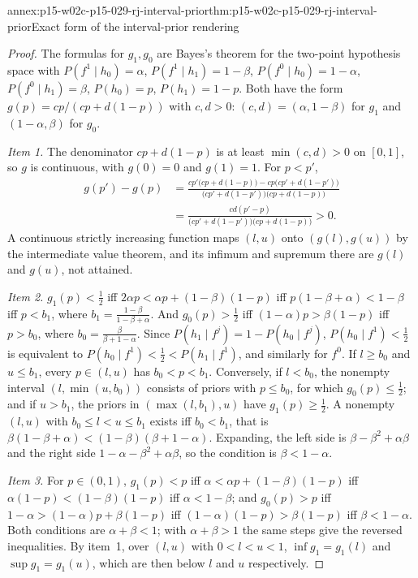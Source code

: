 \begin{annexitem}{annex:p15-w02c-p15-029-rj-interval-prior}{thm:p15-w02c-p15-029-rj-interval-prior}{Exact form of the interval-prior rendering}
\begin{proof}
The formulas for \(g_1,g_0\) are Bayes's theorem for the two-point
hypothesis space with \(P(f^1\mid h_0)=\alpha\),
\(P(f^1\mid h_1)=1-\beta\), \(P(f^0\mid h_0)=1-\alpha\),
\(P(f^0\mid h_1)=\beta\), \(P(h_0)=p\), \(P(h_1)=1-p\). Both have the
form \(g(p)=cp/(cp+d(1-p))\) with \(c,d>0\): \((c,d)=(\alpha,1-\beta)\)
for \(g_1\) and \((1-\alpha,\beta)\) for \(g_0\).

\emph{Item 1.} The denominator \(cp+d(1-p)\) is at least
\(\min(c,d)>0\) on \([0,1]\), so \(g\) is continuous, with \(g(0)=0\)
and \(g(1)=1\). For \(p<p'\),
\begin{align*}
 g(p')-g(p)&=\frac{cp'\bigl(cp+d(1-p)\bigr)-cp\bigl(cp'+d(1-p')\bigr)}{\bigl(cp'+d(1-p')\bigr)\bigl(cp+d(1-p)\bigr)}\\
 &=\frac{cd(p'-p)}{\bigl(cp'+d(1-p')\bigr)\bigl(cp+d(1-p)\bigr)}>0 .
\end{align*}
A continuous strictly increasing function maps \((l,u)\) onto
\((g(l),g(u))\) by the intermediate value theorem, and its infimum and
supremum there are \(g(l)\) and \(g(u)\), not attained.

\emph{Item 2.} \(g_1(p)<\tfrac12\) iff \(2\alpha p<\alpha p+(1-\beta)(1-p)\)
iff \(p(1-\beta+\alpha)<1-\beta\) iff \(p<b_1\), where
\(b_1=\frac{1-\beta}{1-\beta+\alpha}\). And \(g_0(p)>\tfrac12\) iff
\((1-\alpha)p>\beta(1-p)\) iff \(p>b_0\), where
\(b_0=\frac{\beta}{\beta+1-\alpha}\). Since
\(P(h_1\mid f^j)=1-P(h_0\mid f^j)\), \(P(h_0\mid f^1)<\tfrac12\) is
equivalent to \(P(h_0\mid f^1)<\tfrac12<P(h_1\mid f^1)\), and similarly for
\(f^0\). If \(l\ge b_0\) and \(u\le b_1\), every \(p\in(l,u)\) has
\(b_0<p<b_1\). Conversely, if \(l<b_0\), the nonempty interval
\((l,\min(u,b_0))\) consists of priors with \(p\le b_0\), for which
\(g_0(p)\le\tfrac12\); and if \(u>b_1\), the priors in
\((\max(l,b_1),u)\) have \(g_1(p)\ge\tfrac12\). A nonempty \((l,u)\) with
\(b_0\le l<u\le b_1\) exists iff \(b_0<b_1\), that is
\(\beta(1-\beta+\alpha)<(1-\beta)(\beta+1-\alpha)\). Expanding, the left
side is \(\beta-\beta^2+\alpha\beta\) and the right side
\(1-\alpha-\beta^2+\alpha\beta\), so the condition is
\(\beta<1-\alpha\).

\emph{Item 3.} For \(p\in(0,1)\), \(g_1(p)<p\) iff
\(\alpha<\alpha p+(1-\beta)(1-p)\) iff \(\alpha(1-p)<(1-\beta)(1-p)\) iff
\(\alpha<1-\beta\); and \(g_0(p)>p\) iff
\(1-\alpha>(1-\alpha)p+\beta(1-p)\) iff \((1-\alpha)(1-p)>\beta(1-p)\) iff
\(\beta<1-\alpha\). Both conditions are \(\alpha+\beta<1\); with
\(\alpha+\beta>1\) the same steps give the reversed inequalities. By
item~1, over \((l,u)\) with \(0<l<u<1\), \(\inf g_1=g_1(l)\) and
\(\sup g_1=g_1(u)\), which are then below \(l\) and \(u\) respectively.


\end{proof}
\end{annexitem}
